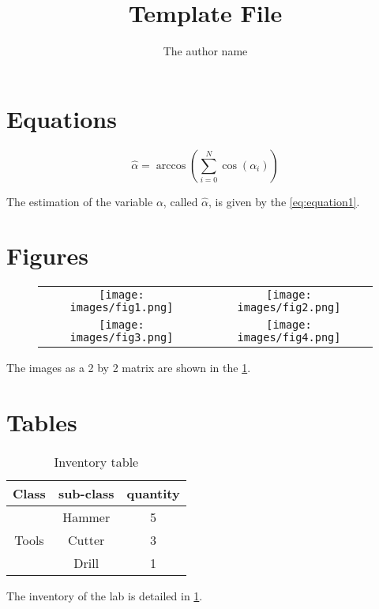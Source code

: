 \documentclass[10pt,twocolumn,letterpaper]{article}
\begin{document}
\nocite{*}

\title{Template File}
\author{The author name}
\maketitle

\section{\label{sec:Equ}Equations}

\begin{equation}
\hat{\alpha} = \arccos \left ( \sum_{i=0}^N \cos(\alpha_i)   \right)
  \label{eq:equation1}
\end{equation}

The estimation of the variable $\alpha$, called $\hat{\alpha}$, is given by the \cref{eq:equation1}.

\section{\label{sec:Fig}Figures}

\begin{figure}[H] %
    \centering
    \begin{tabular}{|c|c|}
         \texttt{[image: images/fig1.png]} &  
         \texttt{[image: images/fig2.png]} \\ 
         \texttt{[image: images/fig3.png]} &
         \texttt{[image: images/fig4.png]} \\
    \end{tabular}
    \caption{}
    \label{fig:4figure}
\end{figure}

The images as a 2 by 2 matrix are shown in the \cref{fig:4figure}.

\section{\label{sec:Tab}Tables}

\begin{table}[H]
    \centering
    \begin{tabular}{|c|c|c|} %
        \hline %
        Class & sub-class & quantity \\
        \hline
        \multirow{3}{5em}{Tools} & Hammer & 5 \\
        \cline{2-3}
        & Cutter & 3\\
        \cline{2-3}
        & Drill & 1\\
        \hline
    \end{tabular}
    \caption{Inventory table}
    \label{tab:inventory}
\end{table}

The inventory of the lab is detailed in \cref{tab:inventory}.

{\small


}
\end{document}
